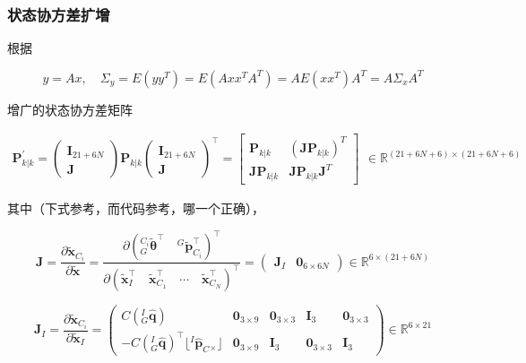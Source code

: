 \documentclass[12pt,a4paper]{article}
\begin{document}
\subsubsection{状态协方差扩增}

根据

$$
y = Ax, \quad {\Sigma}_y = E(yy^T) = E(Ax x^T A^T) = A E(xx^T) A^T = A {\Sigma}_x A^T
$$

增广的状态协方差矩阵

\begin{equation}
\begin{aligned}
\mathbf{P}_{k|k}^{\prime}
= 
\begin{pmatrix}
\mathbf{I}_{21+6N} \\ \mathbf{J}
\end{pmatrix}
\mathbf{P}_{k|k}
\begin{pmatrix}
\mathbf{I}_{21+6N} \\ \mathbf{J}
\end{pmatrix}^\top 
=
\begin{bmatrix}
\mathbf{P}_{k|k} & (\mathbf{J} \mathbf{P}_{k|k})^T \\
\mathbf{J} \mathbf{P}_{k|k} & \mathbf{J} \mathbf{P}_{k|k} \mathbf{J}^T
\end{bmatrix}
\end{aligned}
\in \mathbb{R}^{(21+6N+6) \times (21+6N+6)}
\end{equation}

其中（下式参考\citep{sun2018robust}，而代码参考\cite{mourikis2007multi}，{\color{red}哪一个正确}），

\begin{equation*}
\mathbf{J} = 
\frac{\partial{\tilde{\mathbf{x}}_{C_i}}}{\partial{\tilde{\mathbf{x}}}} = 
\frac{
\partial{\left(
{}^{C_i}_G\tilde{\boldsymbol{\theta}}^\top \quad
{}^G\tilde{\mathbf{p}}_{C_i}^\top
\right)^\top}}
{\partial{\left(
\tilde{\mathbf{x}}_I^\top \quad
\tilde{\mathbf{x}}_{C_1}^\top \quad
\cdots \quad 
\tilde{\mathbf{x}}_{C_N}^\top
\right)^\top}} = 
\begin{pmatrix}
\mathbf{J}_I & \mathbf{0}_{6\times 6N}
\end{pmatrix}
\in \mathbb{R}^{6 \times (21+6N)}
\end{equation*}

\begin{equation*}
\mathbf{J}_I = 
\frac{\partial{\tilde{\mathbf{x}}_{C_i}}}{\partial{\tilde{\mathbf{x}}_I}} = 
\begin{pmatrix}
C\left({}^I_G\hat{\mathbf{q}}\right) & \mathbf{0}_{3\times 9} & 
\mathbf{0}_{3\times 3} & \mathbf{I}_3 & \mathbf{0}_{3\times 3} \\
-C\left({}^I_G\hat{\mathbf{q}}\right)^\top \lfloor{}^I\hat{\mathbf{p}}_C {}_{\times}\rfloor & 
\mathbf{0}_{3\times 9} & \mathbf{I}_3 & \mathbf{0}_{3\times 3} & 
\mathbf{I}_{3}
\end{pmatrix}
\in \mathbb{R}^{6 \times 21}
\end{equation*}
\end{document}

